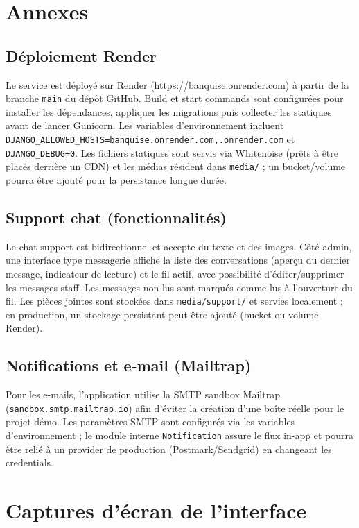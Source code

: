 \documentclass[12pt,a4paper]{report}
\begin{document}
\chapter{Annexes}
\section{Déploiement Render}
Le service est déployé sur Render (\url{https://banquise.onrender.com}) à partir de la branche \texttt{main} du dépôt GitHub. Build et start commands sont configurées pour installer les dépendances, appliquer les migrations puis collecter les statiques avant de lancer Gunicorn. Les variables d'environnement incluent \texttt{DJANGO\_ALLOWED\_HOSTS=banquise.onrender.com,.onrender.com} et \texttt{DJANGO\_DEBUG=0}. Les fichiers statiques sont servis via Whitenoise (prêts à être placés derrière un CDN) et les médias résident dans \texttt{media/} ; un bucket/volume pourra être ajouté pour la persistance longue durée.

\section{Support chat (fonctionnalités)}
Le chat support est bidirectionnel et accepte du texte et des images. Côté admin, une interface type messagerie affiche la liste des conversations (aperçu du dernier message, indicateur de lecture) et le fil actif, avec possibilité d'éditer/supprimer les messages staff. Les messages non lus sont marqués comme lus à l'ouverture du fil. Les pièces jointes sont stockées dans \texttt{media/support/} et servies localement ; en production, un stockage persistant peut être ajouté (bucket ou volume Render).
\section{Notifications et e-mail (Mailtrap)}
Pour les e-mails, l'application utilise la SMTP sandbox Mailtrap (\texttt{sandbox.smtp.mailtrap.io}) afin d'éviter la création d'une boîte réelle pour le projet démo. Les paramètres SMTP sont configurés via les variables d'environnement ; le module interne \texttt{Notification} assure le flux in-app et pourra être relié à un provider de production (Postmark/Sendgrid) en changeant les credentials.

\chapter{Captures d'écran de l'interface}
\end{document}
